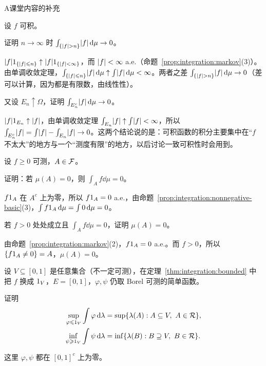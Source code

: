 \begin{exercises}{A}{课堂内容的补充}
\item\label{ex:integration:A6} 设 $f$ 可积。
\begin{questions}
\item 证明 $n\to\infty$ 时 $\int_{\{\lvert f\rvert>n\}}\lvert f\rvert\,\mathrm{d}\mu\to0$。
\begin{solution}
$\lvert f\rvert1_{\{\lvert f\rvert\leqslant n\}}\uparrow\lvert f\rvert1_{\{\lvert f\rvert<\infty\}}$，而 $\lvert f\rvert<\infty$ a.e.（命题~\ref{prop:integration:markov}(3)）。由单调收敛定理，$\int_{\{\lvert f\rvert\leqslant n\}}\lvert f\rvert\,\mathrm{d}\mu\uparrow\int\lvert f\rvert\,\mathrm{d}\mu<\infty$。两者之差 $\int_{\{\lvert f\rvert>n\}}\lvert f\rvert\,\mathrm{d}\mu\to0$（差可以计算，因为都是有限数，由线性性）。
\end{solution}
\item 又设 $E_n\uparrow\Omega$，证明 $\int_{E_n^c}\lvert f\rvert\,\mathrm{d}\mu\to0$。
\begin{solution}
$\lvert f\rvert1_{E_n}\uparrow\lvert f\rvert$，由单调收敛定理 $\int_{E_n}\lvert f\rvert\uparrow\int\lvert f\rvert<\infty$，所以 $\int_{E_n^c}\lvert f\rvert=\int\lvert f\rvert-\int_{E_n}\lvert f\rvert\to0$。这两个结论说的是：可积函数的积分主要集中在“$f$ 不太大”的地方与一个“测度有限”的地方，以后讨论一致可积性时会用到。
\end{solution}
\end{questions}

\item\label{ex:integration:A7} 设 $f\geqslant0$ 可测，$A\in\mathcal{F}$。
\begin{questions}
\item 证明：若 $\mu(A)=0$，则 $\int_Af\dd\mu=0$。
\begin{solution}
$f1_A$ 在 $A^c$ 上为零，所以 $f1_A=0$ a.e.，由命题~\ref{prop:integration:nonnegative-basic}(3)，$\int f1_A\,\mathrm{d}\mu=\int0\,\mathrm{d}\mu=0$。
\end{solution}
\item 若 $f>0$ 处处成立且 $\int_Af\dd\mu=0$，证明 $\mu(A)=0$。
\begin{solution}
由命题~\ref{prop:integration:markov}(2)，$f1_A=0$ a.e.。而 $f>0$，所以 $\{f1_A\neq0\}=A$，$\mu(A)=0$。
\end{solution}
\end{questions}

\item\label{ex:integration:A8} 设 $V\subseteq[0,1]$ 是任意集合（不一定可测），在定理~\ref{thm:integration:bounded} 中把 $f$ 换成 $1_V$，$E=[0,1]$，$\varphi,\psi$ 仍取 Borel 可测的简单函数。
\begin{questions}
\item 证明
\[
\begin{aligned}
\sup_{\varphi\leqslant1_V}\int\varphi\,\mathrm{d}\lambda&=\sup\{\lambda(A):A\subseteq V,\ A\in\mathcal{R}\},\\
\inf_{\psi\geqslant1_V}\int\psi\,\mathrm{d}\lambda&=\inf\{\lambda(B):B\supseteq V,\ B\in\mathcal{R}\}.
\end{aligned}
\]
\begin{solution}
这里 $\varphi,\psi$ 都在 $[0,1]^c$ 上为零。


\end{solution}
\end{questions}
\end{exercises}
